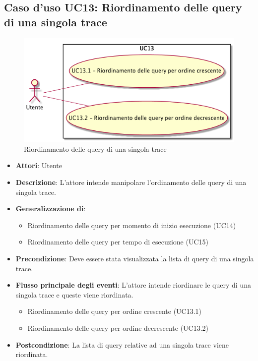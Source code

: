 \subsection{Caso d'uso UC13: Riordinamento delle query di una singola trace}
\begin{figure} [H]
	\centering
	\includegraphics[scale=0.45]{./UC/UC13.png}
	\caption{Riordinamento delle query di una singola trace}\label{}
\end{figure}
\begin{itemize}
	\item \textbf{Attori}: Utente
	\item \textbf{Descrizione}: L'attore intende manipolare l'ordinamento delle query di una singola trace.
	\item 	\textbf{Generalizzazione di}:
	\begin{itemize}
		\item Riordinamento delle query per momento di inizio esecuzione (UC14)
		\item Riordinamento delle query per tempo di esecuzione (UC15)
	\end{itemize}
	\item \textbf{Precondizione}: Deve essere stata visualizzata la lista di query di una singola trace.
	\item \textbf{Flusso principale degli eventi}: L'attore intende riordinare le query di una singola trace e queste viene riordinata.
	\begin{itemize}
		\item Riordinamento delle query per ordine crescente (UC13.1)
		\item Riordinamento delle query per ordine decrescente (UC13.2)
	\end{itemize}
	\item \textbf{Postcondizione}: La lista di query relative ad una singola trace viene riordinata.
\end{itemize}
